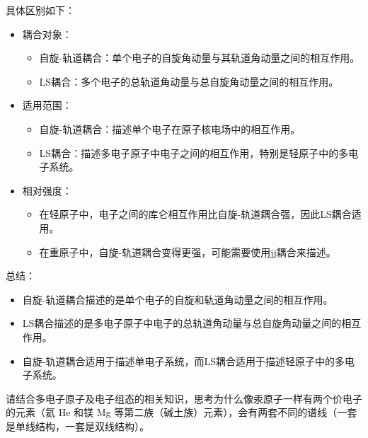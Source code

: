 \documentclass[dvipsnames, svgnames,a4paper,11pt]{article}
\begin{document}
	具体区别如下：

		\begin{itemize}
			\item 耦合对象：

				\begin{itemize}
					\item 自旋-轨道耦合：单个电子的自旋角动量与其轨道角动量之间的相互作用。
					\item LS耦合：多个电子的总轨道角动量与总自旋角动量之间的相互作用。
				\end{itemize}
			
			\item 适用范围：

				\begin{itemize}
					\item 自旋-轨道耦合：描述单个电子在原子核电场中的相互作用。
					\item LS耦合：描述多电子原子中电子之间的相互作用，特别是轻原子中的多电子系统。
				\end{itemize}
			
			\item 相对强度：

				\begin{itemize}
					\item 在轻原子中，电子之间的库仑相互作用比自旋-轨道耦合强，因此LS耦合适用。
					\item 在重原子中，自旋-轨道耦合变得更强，可能需要使用jj耦合来描述。
				\end{itemize}
			
		\end{itemize}
	
	总结：

		\begin{itemize}
			\item 自旋-轨道耦合描述的是单个电子的自旋和轨道角动量之间的相互作用。
			\item LS耦合描述的是多电子原子中电子的总轨道角动量与总自旋角动量之间的相互作用。
			\item 自旋-轨道耦合适用于描述单电子系统，而LS耦合适用于描述轻原子中的多电子系统。
		\end{itemize}






\begin{question}
	请结合多电子原子及电子组态的相关知识，思考为什么像汞原子一样有两个价电子的元素（氦 He 和镁 Mg 等第二族（碱土族）元素），会有两套不同的谱线（一套是单线结构，一套是双线结构）。
\end{question}
\end{document}
